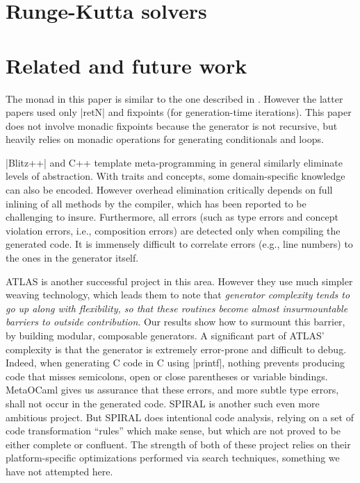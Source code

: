 \documentclass[draft]{elsart}
\begin{document}
\section{Runge-Kutta solvers}
\label{s:ode}

\section{Related and future work}\label{related}

The monad in this paper is similar to the one described in
\cite{MSP:PADL04,KiselyovTaha}.  However the latter papers used only
|retN| and fixpoints (for generation-time iterations).  This paper
does not involve monadic fixpoints because the generator is not
recursive, but heavily relies on monadic operations for generating
conditionals and loops.

|Blitz++| \cite{Veldhuizen:1998:ISCOPE} and {C++} template
meta-programming in general similarly eliminate levels
of abstraction.  With traits and concepts, some domain-specific
knowledge can also be encoded.  However overhead elimination
critically depends on full inlining of all methods by the compiler,
which has been reported to be challenging to insure. Furthermore, all
errors (such as type errors and concept violation errors, i.e.,
composition errors) are detected only when compiling the generated
code. It is immensely difficult to correlate errors (e.g., line
numbers) to the ones in the generator itself.

ATLAS \cite{ATLAS} is another successful project in this area.
However they use much simpler weaving technology, which leads them to
note that \emph{generator complexity tends to go up along with
  flexibility, so that these routines become almost insurmountable
  barriers to outside contribution}. Our results show how to surmount
this barrier, by building modular, composable generators. A
significant part of ATLAS' complexity is that the generator is
extremely error-prone and difficult to debug.  Indeed, when generating
C code in C using |printf|, nothing prevents producing code that
misses semicolons, open or close parentheses or variable
bindings. MetaOCaml gives us assurance that these errors, and more
subtle type errors, shall not occur in the generated code.  SPIRAL
\cite{Pueschel:05} is another such even more ambitious project.  But
SPIRAL does intentional code analysis, relying on a set of code
transformation ``rules'' which make sense, but which are not proved to
be either complete or confluent.  The strength of both of these
project relies on their platform-specific optimizations performed via
search techniques, something we have not attempted here.
\end{document}
